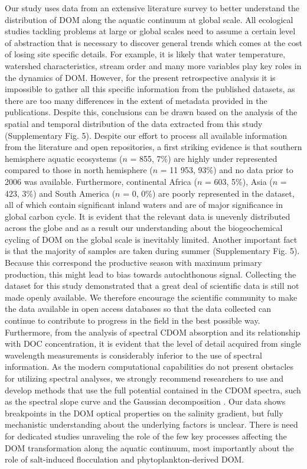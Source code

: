 Our study uses data from an extensive literature survey to better understand the distribution of DOM along the aquatic continuum at global scale. All ecological studies tackling problems at large or global scales need to assume a certain level of abstraction that is necessary to discover general trends which comes at the cost of losing site specific details. For example, it is likely that water temperature, watershed characteristics, stream order and many more variables play key roles in the dynamics of DOM. However, for the present retrospective analysis it is impossible to gather all this specific information from the published datasets, as there are too many differences in the extent of metadata provided in the publications. Despite this, conclusions can be drawn based on the analysis of the spatial and temporal distribution of the data extracted from this study (Supplementary Fig. 5). Despite our effort to process all available information from the literature and open repositories, a first striking evidence is that southern hemisphere aquatic ecosystems ($n$ = 855, 7\%) are highly under represented compared to those in north hemisphere ($n$ = 11 953, 93\%) and no data prior to 2006 was available. Furthermore, continental Africa ($n$ = 603, 5\%), Asia ($n$ = 423, 3\%) and South America ($n$ = 0, 0\%) are poorly represented in the dataset, all of which contain significant inland waters and are of major significance in global carbon cycle. It is evident that the relevant data is unevenly distributed across the globe and as a result our understanding about the biogeochemical cycling of DOM on the global scale is inevitably limited. Another important fact is that the majority of samples are taken during summer (Supplementary Fig. 5). Because this correspond the productive season with maximum primary production, this might lead to bias towards autochthonous signal. Collecting the dataset for this study demonstrated that a great deal of scientific data is still not made openly available. We therefore encourage the scientific community to make  the data available in open access databases so that the data collected can continue to contribute to progress in the field in the best possible way. Furthermore, from the analysis of spectral CDOM absorption and its relationship with DOC concentration, it is evident that the level of detail acquired from single wavelength measurements is considerably inferior to the use of spectral information. As the modern computational capabilities do not present obstacles for utilizing spectral analyses, we strongly recommend researchers to use and develop methods that use the full potential contained in the CDOM spectra, such as the spectral slope curve \citep{Loiselle2009} and the Gaussian decomposition \citep{Massicotte2016MC}. Our data shows breakpoints in the DOM optical properties on the salinity gradient, but fully mechanistic understanding about the underlying factors is unclear. There is need for dedicated studies unraveling the role of the few key processes affecting the DOM transformation along the aquatic continuum, most importantly about the role of salt-induced flocculation and phytoplankton-derived DOM.


